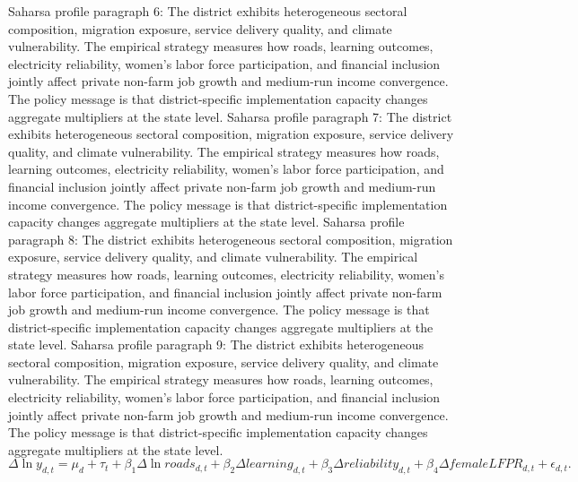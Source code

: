 \documentclass[preprint,12pt]{elsarticle}
\begin{document}
Saharsa profile paragraph 6: The district exhibits heterogeneous sectoral composition, migration exposure, service delivery quality, and climate vulnerability. The empirical strategy measures how roads, learning outcomes, electricity reliability, women's labor force participation, and financial inclusion jointly affect private non-farm job growth and medium-run income convergence. The policy message is that district-specific implementation capacity changes aggregate multipliers at the state level.
Saharsa profile paragraph 7: The district exhibits heterogeneous sectoral composition, migration exposure, service delivery quality, and climate vulnerability. The empirical strategy measures how roads, learning outcomes, electricity reliability, women's labor force participation, and financial inclusion jointly affect private non-farm job growth and medium-run income convergence. The policy message is that district-specific implementation capacity changes aggregate multipliers at the state level.
Saharsa profile paragraph 8: The district exhibits heterogeneous sectoral composition, migration exposure, service delivery quality, and climate vulnerability. The empirical strategy measures how roads, learning outcomes, electricity reliability, women's labor force participation, and financial inclusion jointly affect private non-farm job growth and medium-run income convergence. The policy message is that district-specific implementation capacity changes aggregate multipliers at the state level.
Saharsa profile paragraph 9: The district exhibits heterogeneous sectoral composition, migration exposure, service delivery quality, and climate vulnerability. The empirical strategy measures how roads, learning outcomes, electricity reliability, women's labor force participation, and financial inclusion jointly affect private non-farm job growth and medium-run income convergence. The policy message is that district-specific implementation capacity changes aggregate multipliers at the state level.
\begin{equation}\Delta \ln y_{d,t}=\mu_d+\tau_t+\beta_1\Delta\ln roads_{d,t}+\beta_2\Delta learning_{d,t}+\beta_3\Delta reliability_{d,t}+\beta_4\Delta femaleLFPR_{d,t}+\epsilon_{d,t}.\end{equation}
\end{document}
